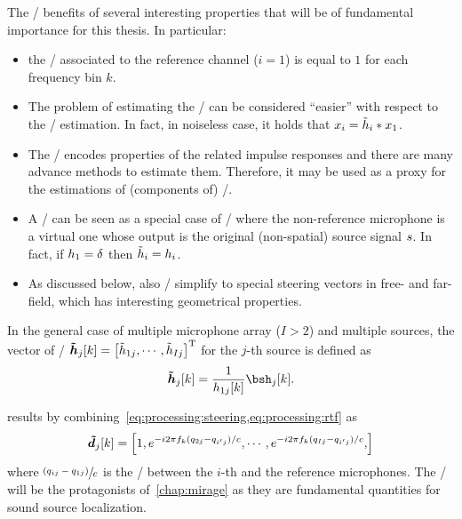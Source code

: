 The \RTFs/ benefits of several interesting properties that will be of fundamental importance for this thesis.
In particular:
\begin{itemize}
    \item the \RTF/ associated to the reference channel ($i = 1$) is equal to $1$ for each frequency bin $k$.
    \item The problem of estimating the \RTF/ can be considered ``easier'' with respect to the \RIRs/ estimation.
    In fact, in noiseless case, it holds that $x_i = \tilde{h}_i \ast x_1$.
    \item The \RTF/ encodes properties of the related impulse responses and there are many advance methods to estimate them.
    Therefore, it may be used as a proxy for the estimations of (components of) \RIRs/.
    \item A \RIR/ can be seen as a special case of \RTF/ where the non-reference microphone is a virtual one whose
    output is the original (non-spatial) source signal $s$. In fact, if $h_1 = \delta$ then $\tilde{h}_i = h_i$.
    \item As discussed below, also \RTFs/ simplify to special steering vectors in free- and far-field, which has interesting
    geometrical properties.
\end{itemize}

In the general case of multiple microphone array ($I>2$) and multiple sources, the vector of \RTFs/ $\rtfs_j[k] = \ktranspose{\klist{\rtf_ {1j}, \cdots, \rtf_{Ij}}}$
for the $j$-th source is defined as
\begin{equation}\label{eq:processing:rtf}
    \rtfs_j[k] = \frac{1}{\rir_{1j}[k]} \rirs_j[k]
    .
\end{equation}


 results by combining~\cref{eq:processing:steering,eq:processing:rtf} as
\begin{equation}\label{eq:processing:relativesteering}
    \boldsymbol{\tilde{d}}_{j}[k] = \klist{
                         1,
                         \cste^{-\csti 2 \pi f_k (\distMicSrc_{2j}-\distMicSrc_{i'j}) / \speedOfSound},
                         \cdots,
                         \cste^{-\csti 2 \pi f_k (\distMicSrc_{Ij}-\distMicSrc_{i'j}) / \speedOfSound},
                    }
\end{equation}
where $\sfrac{(q_{ij}-q_{1j})}{c}$ is the \TDOA/ between the $i$-th and the reference microphones.
The \TDOAs/ will be the protagonists of~\cref{chap:mirage} as they are fundamental quantities for sound source localization.

